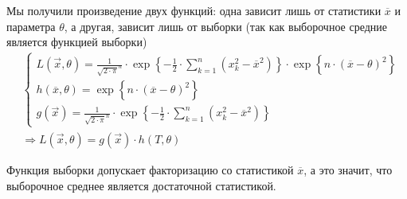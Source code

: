 \begin{example}
    Мы получили произведение двух функций:
    одна зависит лишь от статистики $\overline{x}$ и параметра $\theta$,
    а другая, зависит лишь от выборки (так как выборочное средние
    является функцией выборки)
    \begin{align*}
        &\begin{cases}
            L\left( \vec{x}, \theta \right)
                = \frac{1}{\sqrt{2 \cdot \pi}^n}
                \cdot \exp{\left\{ -\frac{1}{2}
                    \cdot \sum_{k=1}^n \left( x_k^2 - \overline{x}^2 \right)
                        \right\}}
                \cdot \exp{\left\{ n \cdot \left( \overline{x}
                    - \theta \right)^2 \right\}} \\
            h\left( \overline{x}, \theta \right)
                = \exp{\left\{ n \cdot \left( \overline{x}
                    - \theta \right)^2 \right\}}\\
            g\left( \vec{x} \right)
                = \frac{1}{\sqrt{2 \cdot \pi}^n}
                \cdot \exp{\left\{ -\frac{1}{2}
                    \cdot \sum_{k=1}^n \left( x_k^2 - \overline{x}^2 \right)
                        \right\}}
        \end{cases} \\
        &\Rightarrow
            L\left( \vec{x}, \theta \right)
                = g\left( \vec{x} \right) \cdot h\left( T, \theta \right)
    \end{align*}

    Функция выборки допускает факторизацию со статистикой $\overline{x}$,
    а это значит, что выборочное среднее является достаточной статистикой.
\end{example}
